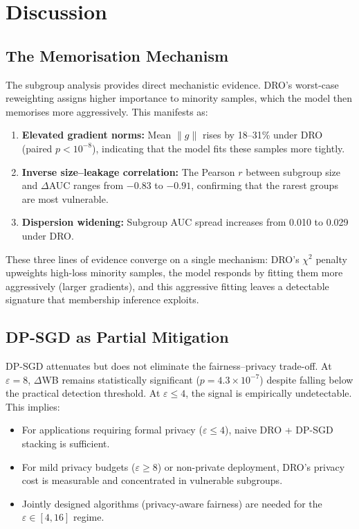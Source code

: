 \documentclass[11pt, a4paper]{article}
\begin{document}
\section{Discussion}

\subsection{The Memorisation Mechanism}

The subgroup analysis provides direct mechanistic evidence. DRO's worst-case reweighting assigns higher importance to minority samples, which the model then memorises more aggressively. This manifests as:
\begin{enumerate}
    \item \textbf{Elevated gradient norms:} Mean $\|g\|$ rises by 18--31\% under DRO (paired $p < 10^{-8}$), indicating that the model fits these samples more tightly.
    \item \textbf{Inverse size--leakage correlation:} The Pearson $r$ between subgroup size and $\Delta$AUC ranges from $-0.83$ to $-0.91$, confirming that the rarest groups are most vulnerable.
    \item \textbf{Dispersion widening:} Subgroup AUC spread increases from 0.010 to 0.029 under DRO.
\end{enumerate}

These three lines of evidence converge on a single mechanism: DRO's $\chi^2$ penalty upweights high-loss minority samples, the model responds by fitting them more aggressively (larger gradients), and this aggressive fitting leaves a detectable signature that membership inference exploits.

\subsection{DP-SGD as Partial Mitigation}

DP-SGD attenuates but does not eliminate the fairness--privacy trade-off. At $\varepsilon = 8$, $\Delta$WB remains statistically significant ($p = 4.3 \times 10^{-7}$) despite falling below the practical detection threshold. At $\varepsilon \le 4$, the signal is empirically undetectable. This implies:
\begin{itemize}
    \item For applications requiring formal privacy ($\varepsilon \le 4$), naive DRO + DP-SGD stacking is sufficient.
    \item For mild privacy budgets ($\varepsilon \ge 8$) or non-private deployment, DRO's privacy cost is measurable and concentrated in vulnerable subgroups.
    \item Jointly designed algorithms (privacy-aware fairness) are needed for the $\varepsilon \in [4, 16]$ regime.
\end{itemize}
\end{document}
